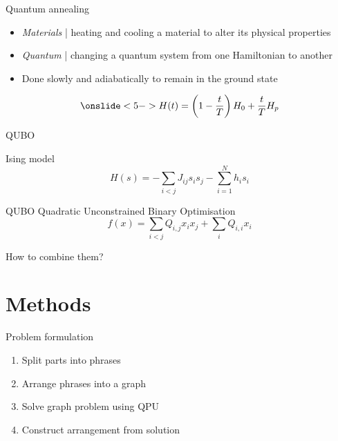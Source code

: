 \documentclass[handout]{beamer}
\begin{document}
\begin{frame}{Quantum annealing}
    \begin{itemize}
        \item<2-> \textit{Materials} | heating and cooling a material to alter its physical properties
        \item<3-> \textit{Quantum} | changing a quantum system from one Hamiltonian to another
        \item<4-> Done slowly and adiabatically to remain in the ground state
    \end{itemize}
    \vfill
    \begin{equation*}
        \onslide<5->{H(t)=\left(1- \frac{t}{T}\right)H_0 + \frac{t}{T}H_p}
    \end{equation*}
\end{frame}

\begin{frame}{QUBO}
    \begin{exampleblock}{Ising model}
        \begin{equation*}
            H(s) = -\sum_{i<j}J_{ij}s_i s_j - \sum_{i=1}^{N}h_i s_i
        \end{equation*}
    \end{exampleblock}

    \begin{alertblock}{QUBO}
        \vspace{0.5em}
        Quadratic Unconstrained Binary Optimisation
        \begin{equation*}
            f(x)=\sum_{i<j}Q_{i,j}x_ix_j + \sum_iQ_{i,i}x_i
        \end{equation*}
    \end{alertblock}
\end{frame}

\begin{frame}[standout]
    \centering
    How to combine them?
\end{frame}

\section{Methods}

\begin{frame}{Problem formulation}
    \begin{enumerate}
        \item<2-> Split parts into phrases
        \item<3-> Arrange phrases into a graph
        \item<4-> Solve graph problem using QPU
        \item<5-> Construct arrangement from solution
    \end{enumerate}
\end{frame}
\end{document}
